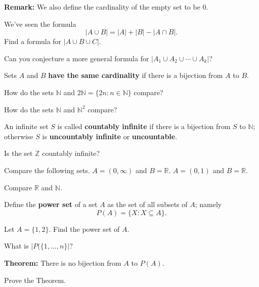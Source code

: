 {\bf Remark:} We also define the cardinality of the empty set to be 0.

\begin{enumerate}

\Problem 
We've seen the formula
\begin{equation*}
	|A\cup B| = |A| + |B| - |A\cap B|.
\end{equation*}
Find a formula for $|A\cup B\cup C|$.  

\vfill

\Problem Can you conjecture a more
general formula for $|A_1 \cup A_2 \cup \cdots \cup A_k|$?
\vfill

\newpage

\begin{defn}
Sets $A$ and $B$ {\bf have the same cardinality} if there is a bijection from $A$ to $B$.
\end{defn}

\Problem How do the sets $\mathbb{N}$ and $2\mathbb{N}=\{2n: n\in \mathbb{N} \}$ compare?

\vfill

\Problem How do the sets $\mathbb{N}$ and $\mathbb{N}^2$ compare?

\vfill

\begin{defn}
An infinite set $S$ is called {\bf countably infinite} if there is a bijection from $S$ to $\mathbb{N}$; otherwise $S$ is {\bf uncountably infinite} or {\bf uncountable}.
\end{defn}

\newpage

\Problem Is the set $\mathbb{Z}$ countably infinite?

\vfill

\Problem Compare the following sets.
\Part $A=(0,\infty)$ and $B=\mathbb{R}$.
\vfill
\Part $A=(0,1)$ and $B=\mathbb{R}$.
\vfill

\newpage

\Problem Compare $\mathbb{R}$ and $\mathbb{N}$.

\newpage

\begin{defn}
Define the {\bf power set} of a set $A$ as the set of all subsets of $A$; namely
$$P(A)=\{ X : X \subseteq A\}.$$
\end{defn}

\Problem Let $A=\{1,2\}$. Find the power set of $A$.

\vfill

\Problem What is $|P(\{1, \dots, n\}|$?

\vfill
\vfill
\vfill
\vfill

\newpage

{\bf Theorem:} There is no bijection from $A$ to $P(A)$.

\Problem Prove the Theorem.

\end{enumerate}


